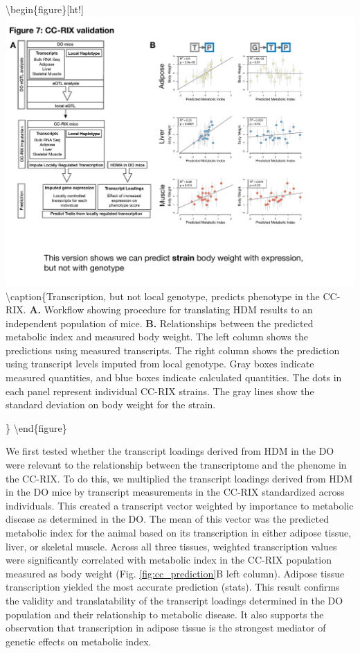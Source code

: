 \documentclass[
]{article}
\begin{document}
\textbackslash begin\{figure\}{[}ht!{]}
\includegraphics[width=\textwidth]{Figures/Fig7_CC_Prediction.pdf}
\textbackslash caption\{Transcription, but not local genotype, predicts
phenotype in the CC-RIX. \textbf{A.} Workflow showing procedure for
translating HDM results to an independent population of mice.
\textbf{B.} Relationships between the predicted metabolic index and
measured body weight. The left column shows the predictions using
measured transcripts. The right column shows the prediction using
transcript levels imputed from local genotype. Gray boxes indicate
measured quantities, and blue boxes indicate calculated quantities. The
dots in each panel represent individual CC-RIX strains. The gray lines
show the standard deviation on body weight for the strain.

\} \label{fig:cc_prediction} \textbackslash end\{figure\}

We first tested whether the transcript loadings derived from HDM in the
DO were relevant to the relationship between the transcriptome and the
phenome in the CC-RIX. To do this, we multiplied the transcript loadings
derived from HDM in the DO mice by transcript measurements in the CC-RIX
standardized across individuals. This created a transcript vector
weighted by importance to metabolic disease as determined in the DO. The
mean of this vector was the predicted metabolic index for the animal
based on its transcription in either adipose tissue, liver, or skeletal
muscle. Across all three tissues, weighted transcription values were
significantly correlated with metabolic index in the CC-RIX population
measured as body weight (Fig. \ref{fig:cc_prediction}B left column).
Adipose tissue transcription yielded the most accurate prediction
(stats). This result confirms the validity and translatability of the
transcript loadings determined in the DO population and their
relationship to metabolic disease. It also supports the observation that
transcription in adipose tissue is the strongest mediator of genetic
effects on metabolic index.
\end{document}
